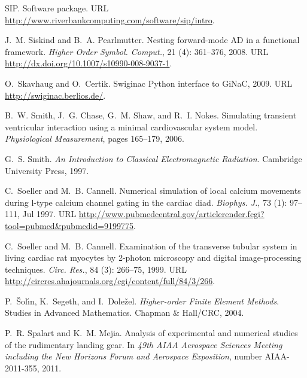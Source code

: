 \begin{thebibliography}{467}
SIP.
\newblock Software package.
\newblock URL \url{http://www.riverbankcomputing.com/software/sip/intro}.

J.~M. Siskind and B.~A. Pearlmutter.
\newblock Nesting forward-mode {AD} in a functional framework.
\newblock \emph{Higher Order Symbol. Comput.}, 21 (4):
  361--376, 2008.
\newblock URL \url{http://dx.doi.org/10.1007/s10990-008-9037-1}.

O.~Skavhaug and O.~Certik.
\newblock Swiginac {P}ython interface to {GiNaC}, 2009.
\newblock URL \url{http://swiginac.berlios.de/}.

B.~W. Smith, J.~G. Chase, G.~M. Shaw, and R.~I. Nokes.
\newblock Simulating transient ventricular interaction using a minimal
  cardiovascular system model.
\newblock \emph{Physiological Measurement}, pages 165--179, 2006.

G.~S. Smith.
\newblock \emph{An Introduction to Classical Electromagnetic Radiation}.
\newblock Cambridge University Press, 1997.

C.~Soeller and M.~B. Cannell.
\newblock Numerical simulation of local calcium movements during l-type calcium
  channel gating in the cardiac diad.
\newblock \emph{Biophys. J.}, 73 (1): 97--111, Jul 1997.
\newblock URL
  \url{http://www.pubmedcentral.gov/articlerender.fcgi?tool=pubmed&pubmedid=9199775}.

C.~Soeller and M.~B. Cannell.
\newblock Examination of the transverse tubular system in living cardiac rat
  myocytes by 2-photon microscopy and digital image-processing techniques.
\newblock \emph{Circ. Res.}, 84 (3): 266--75, 1999.
\newblock URL \url{http://circres.ahajournals.org/cgi/content/full/84/3/266}.

P.~{\v{S}}ol{\'{\i}}n, K.~Segeth, and I.~Dole{\v{z}}el.
\newblock \emph{Higher-order Finite Element Methods}.
\newblock Studies in Advanced Mathematics. Chapman \& Hall/CRC, 2004.

P.~R. Spalart and K.~M. Mejia.
\newblock Analysis of experimental and numerical studies of the rudimentary
  landing gear.
\newblock In \emph{49th AIAA Aerospace Sciences Meeting including the New
  Horizons Forum and Aerospace Exposition}, number AIAA-2011-355, 2011.


\end{thebibliography}
